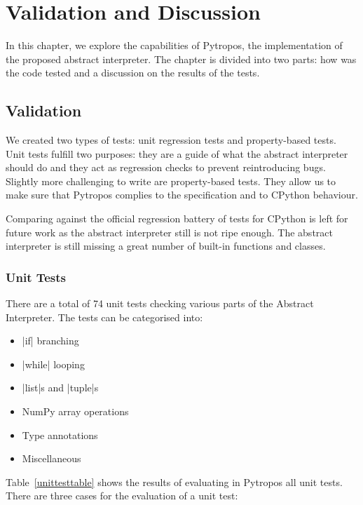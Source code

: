 \chapter{Validation and Discussion}\label{validation-and-discussion}

In this chapter, we explore the capabilities of Pytropos, the implementation of the
proposed abstract interpreter. The chapter is divided into two parts: how was the code
tested and a discussion on the results of the tests.

\section{Validation}\label{validation}

We created two types of tests: unit regression tests and property-based tests. Unit tests
fulfill two purposes: they are a guide of what the abstract interpreter should do and they
act as regression checks to prevent reintroducing bugs. Slightly more challenging to
write are property-based tests. They allow us to make sure that Pytropos complies to the
specification and to CPython behaviour.

Comparing against the official regression battery of tests for CPython is left for future
work as the abstract interpreter still is not ripe enough. The abstract interpreter is
still missing a great number of built-in functions and classes.

\subsection{Unit Tests}\label{unit-tests}

There are a total of 74 unit tests checking various parts of the Abstract Interpreter. The
tests can be categorised into:

\begin{itemize}
\tightlist
\item \pycode|if| branching
\item \pycode|while| looping
\item \pycode|list|s and \pycode|tuple|s
\item NumPy array operations
\item Type annotations
\item Miscellaneous
\end{itemize}

Table~\ref{unittesttable} shows the results of evaluating in Pytropos all unit tests.
There are three cases for the evaluation of a unit test:

